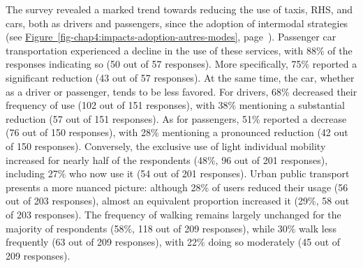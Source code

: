 \begin{refsegment}
The survey revealed a marked trend towards reducing the use of taxis, \acrshort{RHS}, and cars, both as drivers and passengers, since the adoption of intermodal strategies (see \hyperref[fig-chap4:impacts-adoption-autres-modes]{Figure~\ref{fig-chap4:impacts-adoption-autres-modes}}, page~\pageref{fig-chap4:impacts-adoption-autres-modes}). Passenger car transportation experienced a decline in the use of these services, with 88\% of the responses indicating so (50 out of 57 responses). More specifically, 75\% reported a significant reduction (43 out of 57 responses). At the same time, the car, whether as a driver or passenger, tends to be less favored. For drivers, 68\% decreased their frequency of use (102 out of 151 responses), with 38\% mentioning a substantial reduction (57 out of 151 responses). As for passengers, 51\% reported a decrease (76 out of 150 responses), with 28\% mentioning a pronounced reduction (42 out of 150 responses). Conversely, the exclusive use of light individual mobility increased for nearly half of the respondents (48\%, 96 out of 201 responses), including 27\% who now use it  (54 out of 201 responses). Urban public transport presents a more nuanced picture: although 28\% of users reduced their usage (56 out of 203 responses), almost an equivalent proportion increased it (29\%, 58 out of 203 responses). The frequency of walking remains largely unchanged for the majority of respondents (58\%, 118 out of 209 responses), while 30\% walk less frequently (63 out of 209 responses), with 22\% doing so moderately (45 out of 209 responses).%


\end{refsegment}
